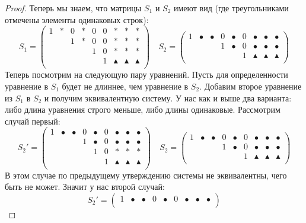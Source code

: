 \begin{proof}
Теперь мы знаем, что матрицы $S_1$ и $S_2$ имеют вид (где треугольниками отмечены элементы одинаковых строк):
\[
S_1 = 
\begin{pmatrix}
{1}&{*}&{0}&{*}&{0}&{0}&{*}&{*}&{*}\\
{}&{}&{1}&{*}&{0}&{0}&{*}&{*}&{*}\\
{}&{}&{}&{}&{1}&{0}&{*}&{*}&{*}\\
{}&{}&{}&{}&{}&{1}&{\blacktriangle}&{\blacktriangle}&{\blacktriangle}\\
\end{pmatrix}\quad
S_2 = 
\begin{pmatrix}
{1}&{\bullet}&{\bullet}&{0}&{\bullet}&{0}&{\bullet}&{\bullet}&{\bullet}\\
{}&{}&{}&{1}&{\bullet}&{0}&{\bullet}&{\bullet}&{\bullet}\\
{}&{}&{}&{}&{}&{1}&{\blacktriangle}&{\blacktriangle}&{\blacktriangle}\\
\end{pmatrix}
\]
Теперь посмотрим на следующую пару уравнений. Пусть для определенности уравнение в $S_1$ будет не длиннее, чем уравнение в $S_2$. Добавим второе уравнение из $S_1$ в $S_2$ и получим эквивалентную систему. У нас как и выше два варианта: либо длина уравнения строго меньше, либо длины одинаковые. Рассмотрим случай первый:
\[
S_2' = 
\begin{pmatrix}
{1}&{\bullet}&{\bullet}&{0}&{\bullet}&{0}&{\bullet}&{\bullet}&{\bullet}\\
{}&{}&{}&{1}&{\bullet}&{0}&{\bullet}&{\bullet}&{\bullet}\\
{}&{}&{}&{}&{1}&{0}&{*}&{*}&{*}\\
{}&{}&{}&{}&{}&{1}&{\blacktriangle}&{\blacktriangle}&{\blacktriangle}\\
\end{pmatrix}\quad
S_2 = 
\begin{pmatrix}
{1}&{\bullet}&{\bullet}&{0}&{\bullet}&{0}&{\bullet}&{\bullet}&{\bullet}\\
{}&{}&{}&{1}&{\bullet}&{0}&{\bullet}&{\bullet}&{\bullet}\\
{}&{}&{}&{}&{}&{1}&{\blacktriangle}&{\blacktriangle}&{\blacktriangle}\\
\end{pmatrix}
\]
В этом случае по предыдущему утверждению системы не эквивалентны, чего быть не может. Значит у нас второй случай:
\[
S_2' = 
\begin{pmatrix}
{1}&{\bullet}&{\bullet}&{0}&{\bullet}&{0}&{\bullet}&{\bullet}&{\bullet}\\

\end{pmatrix}\]
\end{proof}
